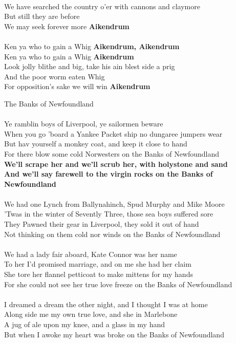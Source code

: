 \documentclass[letterpaper,9pt]{article}
\begin{document}
\\We have searched the country o'er with cannons and claymore
\\But still they are before
\\We may seek forever more \textbf{Aikendrum}
\\
\\Ken ya who to gain a Whig \textbf{Aikendrum, Aikendrum}
\\Ken ya who to gain a Whig \textbf{Aikendrum}
\\Look jolly blithe and big, take his ain blest side a prig
\\And the poor worm eaten Whig
\\For opposition's sake we will win \textbf{Aikendrum}

\newpage
{}
\huge
The Banks of Newfoundland\\
\\
\Large
\noindent
Ye ramblin boys of Liverpool, ye sailormen beware
\\When you go 'board a Yankee Packet ship no dungaree jumpers wear
\\But hav yourself a monkey coat, and keep it close to hand
\\For there blow some cold Norwesters on the Banks of Newfoundland
\\\textbf{We'll scrape her and we'll scrub her, with holystone and sand
\\And we'll say farewell to the virgin rocks on the Banks of Newfoundland}
\\
\\We had one Lynch from Ballynahinch, Spud Murphy and Mike Moore
\\'Twas in the winter of Sevently Three, those sea boys suffered sore
\\They Pawned their gear in Liverpool, they sold it out of hand
\\Not thinking on them cold nor winds on the Banks of Newfoundland
\\
\\We had a lady fair aboard, Kate Connor was her name
\\To her I'd promised marriage, and on me she had her claim
\\She tore her flannel petticoat to make mittens for my hands
\\For she could not see her true love freeze on the Banks of Newfoundland
\\
\\I dreamed a dream the other night, and I thought I was at home
\\Along side me my own true love, and she in Marlebone
\\A jug of ale upon my knee, and a glass in my hand
\\But when I awoke my heart was broke on the Banks of Newfoundland
\end{document}
